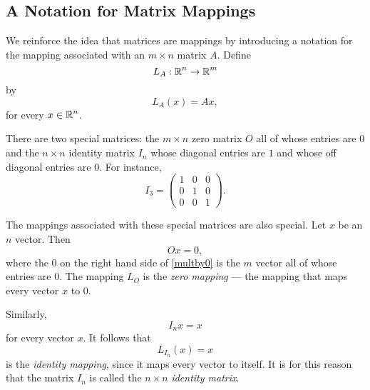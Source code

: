 \documentclass{ximera}
\begin{document}
\subsection*{A Notation for Matrix Mappings}

We reinforce the idea that matrices are mappings by introducing a notation 
for the mapping associated with an $m\times n$ matrix $A$.  Define
\[
L_A:\mbox{$\Bbb{R}$}^n\to\mbox{$\Bbb{R}$}^m
\]
by
\[
L_A(x) = Ax,
\]
for every $x\in\mbox{$\Bbb{R}$}^n$.

There are two special matrices:  the $m\times n$ zero matrix 
 $O$ all of whose entries are $0$ and the 
$n\times n$ identity matrix  $I_n$ whose diagonal 
entries are $1$ and whose off diagonal entries are $0$.  For instance,
\[
	I_3 = \left(
\begin{array}{rrr}
 1 & 0 & 0  \\
 0 & 1 & 0  \\
 0 & 0 & 1
\end{array}
\right).
\]

The mappings associated with these special matrices are also special.  
Let $x$ be an $n$ vector.  Then
\begin{equation} \label{multby0}
Ox=0,
\end{equation}
where the $0$ on the right hand side of \eqref{multby0} is the $m$
vector all of whose entries are $0$.  The mapping $L_O$ is the 
{\em zero mapping\/}  --- the mapping 
that maps every vector $x$ to $0$.

Similarly,
\[
I_nx=x
\]
for every vector $x$.  It follows that
\[
L_{I_n}(x) = x
\]
is the {\em identity mapping\/},  since
it maps every vector to itself.  It is for this reason that the
matrix $I_n$ is called the $n\times n$ {\em identity matrix\/}.

\EXER

\end{document}
